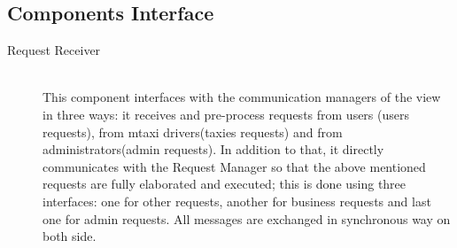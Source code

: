 \documentclass[11pt,titlepage]{article} %
\begin{document}
\subsection{Components Interface}
\begin{description}
     \item [Request Receiver] \hfill \\
          This component interfaces with the communication managers of the view in three ways: it receives and pre-process requests from users
          (users requests), from mtaxi drivers(taxies requests) and from
          administrators(admin requests). In addition to that, it
          directly communicates with the Request Manager so that the above  mentioned requests are
          fully elaborated and executed; this is done using three interfaces: one for other requests, another for business
          requests and last one for admin requests.
          All messages are exchanged in synchronous way on both side.


\end{description}
\end{document}
